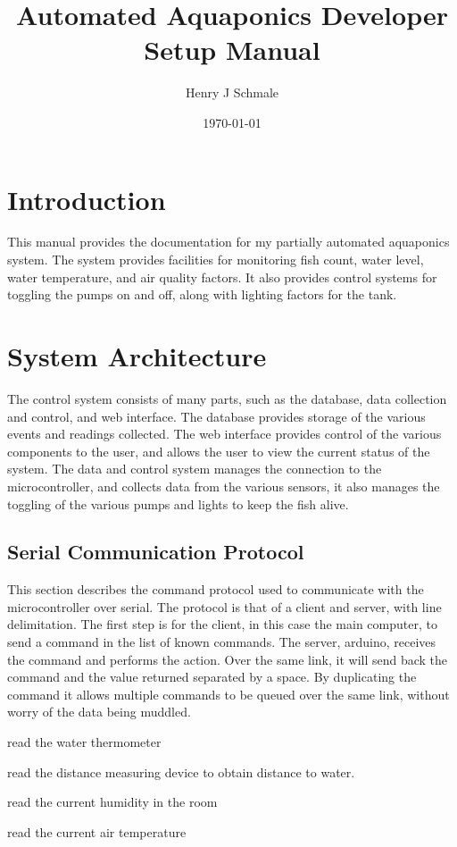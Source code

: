 \documentclass[american,man,12pt]{apa6}
\title{Automated Aquaponics Developer Setup Manual}
\author{Henry J Schmale}
\affiliation{Harrisburg University of Science and Technology}
\date{\today}
\begin{document}
\maketitle

\section{Introduction}
This manual provides the documentation for my partially automated aquaponics
system. The system provides facilities for monitoring fish count, water level,
water temperature, and air quality factors. It also provides control systems
for toggling the pumps on and off, along with lighting factors for the tank.

\section{System Architecture}
The control system consists of many parts, such as the database, data collection
and control, and web interface. The database provides storage of the various
events and readings collected. The web interface provides control of the various
components to the user, and allows the user to view the current status of the system.
The data and control system manages the connection to the microcontroller, and collects
data from the various sensors, it also manages the toggling of the various pumps and
lights to keep the fish alive.



\subsection{Serial Communication Protocol}
This section describes the command protocol used to communicate with the
microcontroller over serial. The protocol is that of a client and server,
with line delimitation. The first step is for the client, in this case the
main computer, to send a command in the list of known commands. The server,
arduino, receives the command and performs the action. Over the same link, it
will send back the command and the value returned separated by a space. By
duplicating the command it allows multiple commands to be queued over the same
link, without worry of the data being muddled.

\begin{description}[style=nextline]
	\item[rWatThm] read the water thermometer
	\item[rdWaLvl] read the distance measuring device to obtain distance to water.
	\item[rdHumid] read the current humidity in the room
	\item[rdAirTm] read the current air temperature
\end{description}
\end{document}
